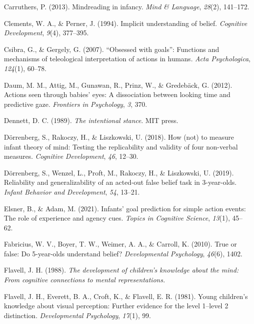 \documentclass[
  man,floatsintext]{apa6}
\newlength{\cslhangindent}
\newenvironment{CSLReferences}[2] %
 {\begin{list}{}{%
  \setlength{\itemindent}{0pt}
  \setlength{\leftmargin}{0pt}
  \setlength{\parsep}{0pt}
  \ifodd #1
   \setlength{\leftmargin}{\cslhangindent}
   \setlength{\itemindent}{-1\cslhangindent}
  \fi
  \setlength{\itemsep}{#2\baselineskip}}}
 {\end{list}}
\begin{document}
\begin{CSLReferences}{1}{0}
Carruthers, P. (2013). Mindreading in infancy. \emph{Mind \& Language}, \emph{28}(2), 141--172.

Clements, W. A., \& Perner, J. (1994). Implicit understanding of belief. \emph{Cognitive Development}, \emph{9}(4), 377--395.

Csibra, G., \& Gergely, G. (2007). {``Obsessed with goals''}: Functions and mechanisms of teleological interpretation of actions in humans. \emph{Acta Psychologica}, \emph{124}(1), 60--78.

Daum, M. M., Attig, M., Gunawan, R., Prinz, W., \& Gredebäck, G. (2012). Actions seen through babies' eyes: A dissociation between looking time and predictive gaze. \emph{Frontiers in Psychology}, \emph{3}, 370.

Dennett, D. C. (1989). \emph{The intentional stance}. MIT press.

Dörrenberg, S., Rakoczy, H., \& Liszkowski, U. (2018). How (not) to measure infant theory of mind: Testing the replicability and validity of four non-verbal measures. \emph{Cognitive Development}, \emph{46}, 12--30.

Dörrenberg, S., Wenzel, L., Proft, M., Rakoczy, H., \& Liszkowski, U. (2019). Reliability and generalizability of an acted-out false belief task in 3-year-olds. \emph{Infant Behavior and Development}, \emph{54}, 13--21.

Elsner, B., \& Adam, M. (2021). Infants' goal prediction for simple action events: The role of experience and agency cues. \emph{Topics in Cognitive Science}, \emph{13}(1), 45--62.

Fabricius, W. V., Boyer, T. W., Weimer, A. A., \& Carroll, K. (2010). True or false: Do 5-year-olds understand belief? \emph{Developmental Psychology}, \emph{46}(6), 1402.

Flavell, J. H. (1988). \emph{The development of children's knowledge about the mind: From cognitive connections to mental representations.}

Flavell, J. H., Everett, B. A., Croft, K., \& Flavell, E. R. (1981). Young children's knowledge about visual perception: Further evidence for the level 1--level 2 distinction. \emph{Developmental Psychology}, \emph{17}(1), 99.


\end{CSLReferences}
\end{document}
